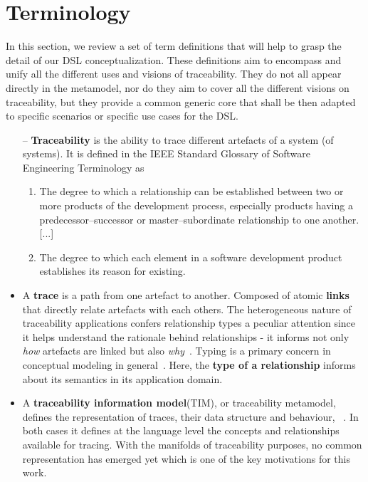 \section{Terminology}\label{sec:terminology}

In this section, we review a set of term definitions that will help to grasp the detail of our DSL conceptualization. 
These definitions aim to encompass and unify all the different uses and visions of traceability. They do not all appear directly in the metamodel, nor do they aim to cover all the different visions on traceability, but they provide a common generic core that shall be then adapted to specific scenarios or specific use cases for the DSL.

\begin{itemize}
	\renewcommand\labelitemi{--}
	\item[--] \textbf{Traceability} is the ability to trace different artefacts of a system (of systems). It is defined in the IEEE Standard Glossary of Software Engineering Terminology \cite{ieeeglossary-se} as 
	\begin{enumerate}
		\item The degree to which a relationship can be established between two or more products of the development process, especially products having a predecessor–successor or master–subordinate relationship to one another. [...]
		\item The degree to which each element in a software development product establishes its reason for existing.
	\end{enumerate}
	
	
	\item A \textbf{trace} is a path from one artefact to another. Composed of atomic \textbf{links} that directly relate artefacts with each others. The heterogeneous nature of traceability applications confers relationship types a peculiar attention since it helps understand the rationale behind relationships - it informs not only \textit{how} artefacts are linked but also \textit{why}~\cite{mader2009-motivation-matters-in-traceability-practitioner-survey}. Typing is a primary concern in conceptual modeling in general~\cite{olive2002-representation-of-generic-relationship-types-in-modeling}. Here, the \textbf{type of a relationship} informs about its semantics in its application domain.
	
	\item A \textbf{traceability information model}(TIM), or traceability metamodel, defines the representation of traces, their data structure and behaviour, ~\cite{drivalos2009-engineering-DSL-for-traceability}. In both cases it defines at the language level the concepts and relationships available for tracing. With the manifolds of traceability purposes, no common representation has emerged yet which is one of the key motivations for this work.
	

\end{itemize}
